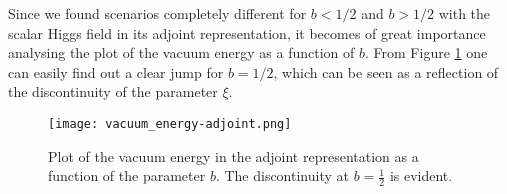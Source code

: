 Since we found scenarios completely different for $b<1/2$ and $b>1/2$ with the scalar Higgs
field in its adjoint representation, it becomes of great importance analysing the plot of the
vacuum energy as a function of $b$. From Figure \ref{BS-d4} one can easily find out a clear jump for $b=1/2$, which can be seen as a reflection of the discontinuity of the parameter  $\xi$.
\begin{figure}[h!]
\center
\texttt{[image: vacuum\_energy-adjoint.png]}
\caption{Plot of the vacuum energy in the adjoint representation as a function of the parameter $b$. The discontinuity at $b=\frac{1}{2}$ is evident. }
\label{BS-d4}
\end{figure}

